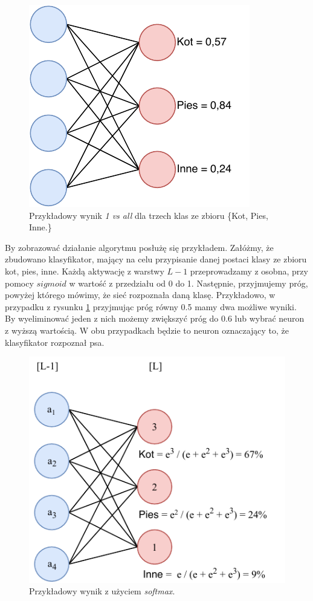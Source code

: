 \begin{figure}[ht]
\centerline{\includegraphics[scale=1]{resources/fc/sigmoid_1vsAll.pdf}}
\caption{Przykładowy wynik \textit{1 vs all} dla trzech klas ze zbioru \big\{Kot, Pies, Inne.\big\}}
\label{fig:1v_all}
\end{figure}

By zobrazować działanie algorytmu posłużę się przykładem. Załóżmy, że zbudowano klasyfikator, mający na celu przypisanie danej postaci klasy ze zbioru {kot, pies, inne}. Każdą aktywację z warstwy \(L-1\) przeprowadzamy z osobna, przy pomocy \(sigmoid\) w wartość z przedziału od 0 do 1. Następnie, przyjmujemy próg, powyżej którego mówimy, że sieć rozpoznała daną klasę. Przykładowo, w przypadku z rysunku \ref{fig:1v_all} przyjmując próg równy 0.5 mamy dwa możliwe wyniki. By wyeliminować jeden z nich możemy zwiększyć próg do 0.6 lub wybrać neuron z wyższą wartością. W obu przypadkach będzie to neuron oznaczający to, że klasyfikator rozpoznał psa.

\begin{figure}[ht]
\centerline{\includegraphics[scale=1]{resources/fc/softmax_fc.pdf}}
\caption{Przykładowy wynik z użyciem \textit{softmax}.}
\label{fig:softmax}
\end{figure}


